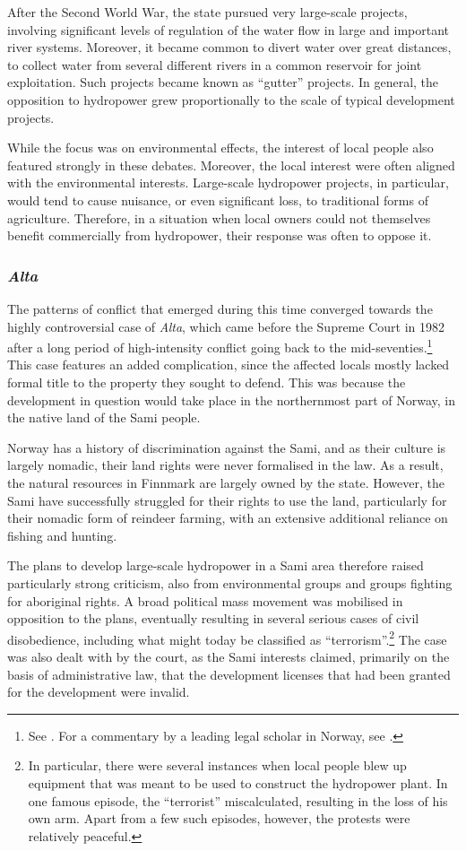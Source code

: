 After the Second World War, the state pursued very large-scale projects, involving significant levels of regulation of the water flow in large and important river systems. Moreover, it became common to divert water over great distances, to collect water from several different rivers in a common reservoir for joint exploitation. Such projects became known as ``gutter'' projects. In general, the opposition to hydropower grew proportionally to the scale of typical development projects.

While the focus was on environmental effects, the interest of local people also featured strongly in these debates. Moreover, the local interest were often aligned with the environmental interests. Large-scale hydropower projects, in particular, would tend to cause nuisance, or even significant loss, to traditional forms of agriculture. Therefore, in a situation when local owners could not themselves benefit commercially  from hydropower, their response was often to oppose it.

\subsubsection{{\it Alta}}\label{sec:alta}

The patterns of conflict that emerged during this time converged towards the highly controversial case of {\it Alta}, which came before the Supreme Court in 1982 after a long period of high-intensity conflict going back to the mid-seventies.\footnote{See \cite{alta82}. For a commentary by a leading legal scholar in Norway, see \cite{eckhoff82}.} This case features an added complication, since the affected locals mostly lacked formal title to the property they sought to defend. This was because the development in question would take place in the northernmost part of Norway, in the native land of the Sami people.

Norway has a history of discrimination against the Sami, and as their culture is largely nomadic, their land rights were never formalised in the law. As a result, the natural resources in Finnmark are largely owned by the state. However, the Sami have successfully struggled for their rights to use the land, particularly for their nomadic form of reindeer farming, with an extensive additional reliance on fishing and hunting.

The plans to develop large-scale hydropower in a Sami area therefore raised particularly strong criticism, also from environmental groups and groups fighting for aboriginal rights. A broad political mass movement was mobilised in opposition to the plans, eventually resulting in several serious cases of civil disobedience, including what might today be classified as ``terrorism''.\footnote{In particular, there were several instances when local people blew up equipment that was meant to be used to construct the hydropower plant. In one famous episode, the ``terrorist'' miscalculated, resulting in the loss of his own arm. Apart from a few such episodes, however, the protests were relatively peaceful.} The case was also dealt with by the court, as the Sami interests claimed, primarily on the basis of administrative law, that the development licenses that had been granted for the development were invalid.

